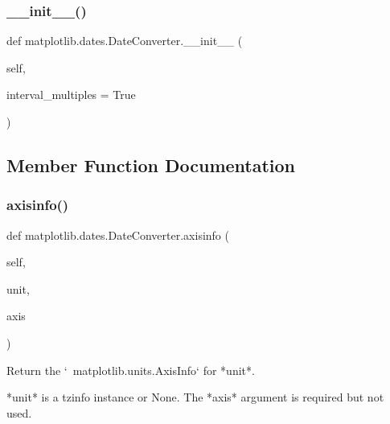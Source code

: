 \subsubsection{\texorpdfstring{\+\_\+\+\_\+init\+\_\+\+\_\+()}{\_\_init\_\_()}}
{\footnotesize\ttfamily def matplotlib.\+dates.\+Date\+Converter.\+\_\+\+\_\+init\+\_\+\+\_\+ (\begin{DoxyParamCaption}\item[{}]{self,  }\item[{}]{interval\+\_\+multiples = {\ttfamily True} }\end{DoxyParamCaption})}



\subsection{Member Function Documentation}
\mbox{\label{classmatplotlib_1_1dates_1_1DateConverter_a2ea7a5964e09496d5e713710a8a5006d}} 
\subsubsection{\texorpdfstring{axisinfo()}{axisinfo()}}
{\footnotesize\ttfamily def matplotlib.\+dates.\+Date\+Converter.\+axisinfo (\begin{DoxyParamCaption}\item[{}]{self,  }\item[{}]{unit,  }\item[{}]{axis }\end{DoxyParamCaption})}

\begin{DoxyVerb}Return the `~matplotlib.units.AxisInfo` for *unit*.

*unit* is a tzinfo instance or None.
The *axis* argument is required but not used.
\end{DoxyVerb}
 \mbox{\label{classmatplotlib_1_1dates_1_1DateConverter_a752b3ec2415640301ad18ba0e18c2f3f}} 
